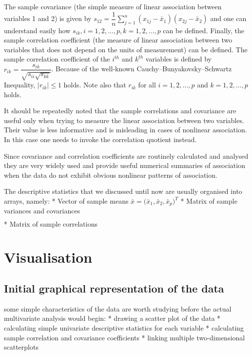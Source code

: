 \documentclass[11pt]{article}
\begin{document}
The sample covariance (the simple measure of linear association between
variables 1 and 2) is given by $s_{12} = \dfrac{1}{n} \sum_{j=1}^{n}(x_{1j} - \bar{x}_1)(x_{2j} - \bar{x}_2)$
and one can understand easily how $s_{ik}, i = 1,2, \dots, p, k = 1,2,\dots,p$ can be
defined.
Finally, the sample correlation coefficient (the measure of linear
association between two variables that does not depend on the units of
measurement) can be defined.
The sample correlation coefficient of the $i^{th}$
and $k^{th}$ variables is defined by $r_{ik} = \dfrac{s_{ik}}{\sqrt{s_{ii}\sqrt{s_{kk}}}}$.
Because of the well-known
Cauchy–Bunyakovsky–Schwartz Inequality, $|r_{ik}| \leq 1$ holds.
Note also that $r_{ik}$ for all $i = 1,2,\dots,p$ and $k=1,2,\dots,p$ holds.

It should be repeatedly noted that the sample correlations and covariance are
useful only when trying to measure the linear association between two variables.
Their value is less informative and is misleading in cases of nonlinear association.
In this case one needs to invoke the correlation quotient instead.

Since covariance and correlation coefficients are routinely calculated and
analysed they are very widely used and provide useful numerical summaries of
association when the data do not exhibit obvious nonlinear patterns of
association.

The descriptive statistics that we discussed until now are usually organised
into arrays, namely:
* Vector of sample means $\bar{x} = \big( \bar{x}_1, \bar{x}_2, \bar{x}_p \big)^T$
* Matrix of sample variances and covariances
\[
\begin{matrix}
\end{matrix}
\]
* Matrix of sample correlations  $$

\section{Visualisation}\label{sec:visualisation}
\subsection{Initial graphical representation of the data}\label{subsec:initial-graphical-representation-of-the-data}
some simple characteristics of the data are worth studying before the actual
multivariate analysis would begin:
* drawing a scatter plot of the data
* calculating simple univariate descriptive statistics for each variable
* calculating sample correlation and covariance coefficients
* linking multiple two-dimensional scatterplots
\end{document}
